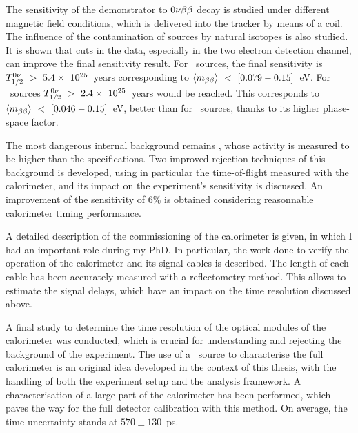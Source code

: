 \begin{mdframed}[linecolor=Prune,linewidth=1]
\begin{footnotesize}
\begin{multicols}{2}
The sensitivity of the demonstrator to $0\nu\beta\beta$ decay is studied under different magnetic field conditions, which is delivered into the tracker by means of a coil.
The influence of the contamination of sources by natural isotopes is also studied.
It is shown that cuts in the data, especially in the two electron detection channel, can improve the final sensitivity result.
For \Se\ sources, the final sensitivity is $T_{1/2}^{0\nu}~>~5.4\times~10^{25}$~years corresponding to $\langle m_{\beta\beta}\rangle~<~[0.079-0.15]$~eV.
For \Nd\ sources $T_{1/2}^{0\nu}~>~2.4\times~10^{25}$~years would be reached.
This corresponds to $\langle m_{\beta\beta}\rangle~<~[0.046-0.15]$~eV, better than for \Se\ sources, thanks to its higher phase-space factor.

The most dangerous internal background remains \Tl, whose activity is measured to be higher than the specifications.
Two improved rejection techniques of this background is developed, using in particular the time-of-flight measured with the calorimeter, and its impact on the experiment's sensitivity is discussed.
An improvement of the sensitivity of $6$\% is obtained considering reasonnable calorimeter timing performance.

A detailed description of the commissioning of the calorimeter is given, in which I had an important role during my PhD.
In particular, the work done to verify the operation of the calorimeter and its signal cables is described.
The length of each cable has been accurately measured with a reflectometry method.
This allows to estimate the signal delays, which have an impact on the time resolution discussed above.

A final study to determine the time resolution of the optical modules of the calorimeter was conducted, which is crucial for understanding and rejecting the background of the experiment.
The use of a \Co\ source to characterise the full calorimeter is an original idea developed in the context of this thesis, with the handling of both the experiment setup and the analysis framework.
A characterisation of a large part of the calorimeter has been performed, which paves the way for the full detector calibration with this method.
On average, the time uncertainty stands at $570\pm 130$~ps.


\end{multicols}
\end{footnotesize}
\end{mdframed}

